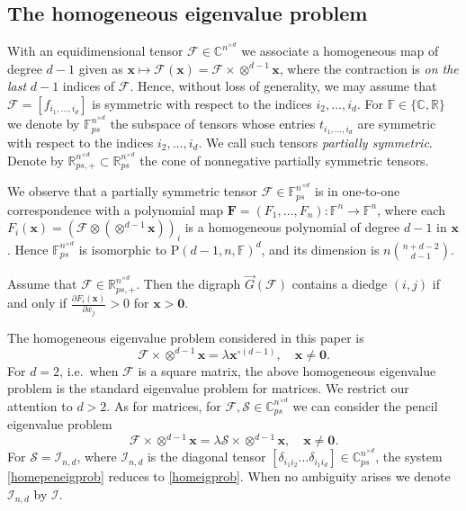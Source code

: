 \documentclass{amsart}
\newcommand{\digraph}{\vec{G}}
\newcommand{\C}{\mathbb{C}}
\newcommand{\F}{\mathbb{F}}
\newcommand{\R}{\mathbb{R}}
\newcommand{\bF}{\mathbf{F}}
\newcommand{\x}{\mathbf{x}}
\newcommand{\0}{\mathbf{0}}
\newcommand{\1}{\mathbf{1}}
\newcommand{\cF}{\mathcal{F}}
\newcommand{\cI}{\mathcal{I}}
\newcommand{\cS}{\mathcal{S}}
\newcommand{\rP}{\mathrm{P}}
\theoremstyle{remark}
\numberwithin{equation}{section} %
\begin{document}
\subsection{The homogeneous eigenvalue problem}\label{subsec:homeigv}
 With an equidimensional tensor $\cF\in \C^{n^{\times d}}$ we associate a homogeneous map of degree $d-1$
 given as $\x\mapsto\cF(\x)=\cF\times \otimes^{d-1}\x$, where the contraction is \emph{on the last}
 $d-1$ indices of $\cF$.  Hence, without loss of generality, we may assume that $\cF=[f_{i_1,\ldots,i_d}]$ is symmetric with respect to
the indices $i_2,\ldots,i_d$.  For $\F\in\{\C,\R\}$ we denote by $\F^{n^{\times d}}_{ps}$ the subspace of tensors whose entries $t_{i_1,\ldots,i_d}$ are symmetric with respect to the indices $i_2,\ldots,i_d$.  We call such tensors \emph{partially symmetric}.  
Denote by $\R_{ps,+}^{n^{\times d}}\subset \R_{ps}^{n^{\times d}}$ the cone of  nonnegative partially symmetric tensors.

We observe that a partially symmetric tensor $\cF\in\F^{n^{\times d}}_{ps}$ is in one-to-one correspondence with a polynomial map $\bF=(F_1,\ldots,F_n):\F^n\to\F^n$, where each $F_i(\x)=(\cF\otimes (\otimes^{d-1}\x))_i$ is a homogeneous polynomial of degree $d-1$ in $\x$.  Hence $\F^{n^{\times d}}_{ps}$ is isomorphic to $\rP(d-1,n,\F)^d$, and its dimension is $n{n+d-2\choose d-1}$.

%

Assume that $\cF\in\R_{ps,+}^{n^{\times d}}$.  Then the digraph  $\digraph(\cF)$ contains a diedge $(i,j)$ if and only if $\frac{\partial F_i(\x)}{\partial x_j}> 0$ for $\x>\0$. 

The homogeneous eigenvalue problem considered in this paper is
 \begin{equation}\label{homeigprob}
 \cF\times \otimes^{d-1}\x=\lambda\x^{\circ (d-1)}, \quad \x\ne \0.
 \end{equation}
 For $d=2$, i.e.\ when $\cF$ is a square matrix, the above homogeneous eigenvalue problem is the standard eigenvalue problem for matrices.
 We restrict our attention to $d>2$. As for matrices, for $\cF,\cS\in \C^{n^{\times d}}_{ps}$ we can consider the pencil eigenvalue problem
%
 \begin{equation}\label{homepeneigprob}
 \cF\times \otimes^{d-1} \x=\lambda \cS\times \otimes^{d-1} \x, \quad \x\ne \0.
 \end{equation}
 For $\cS=\cI_{n,d}$, where $\cI_{n,d}$ is the diagonal tensor $[\delta_{i_1i_2}\ldots\delta_{i_1i_d}]\in \C^{n^{\times d}}_{ps}$, the system
 \eqref{homepeneigprob} reduces to \eqref{homeigprob}.  When no ambiguity arises we denote $\cI_{n,d}$ by $\cI$.
\end{document}
